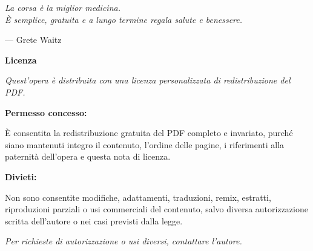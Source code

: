 \newpage{}
\thispagestyle {empty}

\vspace*{2cm}

\begin{center}
	\Large{\parbox{8cm}{
		\begin{raggedright}
		{\Large 
			\textit{La corsa è la miglior medicina.\\
                  È semplice, gratuita e a lungo termine regala salute e benessere.}
		}
	
		\vspace{.5cm}\hfill{--- Grete Waitz}
		\end{raggedright}
	}
}
\end{center}

\newpage

\thispagestyle{empty}
\vspace*{3.5cm}
\begin{center}
{\Large\sffamily\bfseries Licenza}

\vspace{1.0cm}
\small
\textit{Quest'opera è distribuita con una licenza personalizzata di redistribuzione del PDF.}

\vspace{0.7cm}
\textbf{Permesso concesso:}

\vspace{0.25cm}
È consentita la redistribuzione gratuita del PDF completo e invariato, purché siano mantenuti integro il contenuto, l'ordine delle pagine, i riferimenti alla paternità dell'opera e questa nota di licenza.

\vspace{0.55cm}
\textbf{Divieti:}

\vspace{0.25cm}
Non sono consentite modifiche, adattamenti, traduzioni, remix, estratti, riproduzioni parziali o usi commerciali del contenuto, salvo diversa autorizzazione scritta dell'autore o nei casi previsti dalla legge.

\vspace{0.5cm}
\textit{Per richieste di autorizzazione o usi diversi, contattare l'autore.}
\end{center}

\newpage


\begingroup
\applytocdepth
\tableofcontents
\endgroup

